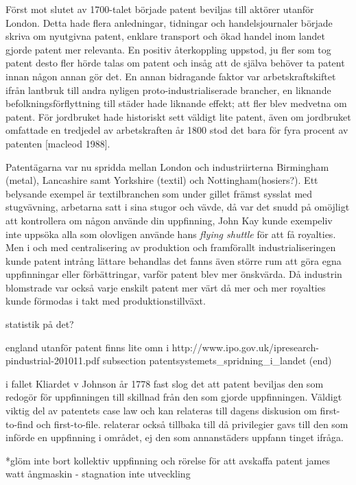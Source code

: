 Först mot slutet av 1700-talet började patent beviljas till aktörer utanför London. Detta hade flera
anledningar, tidningar och handelsjournaler började skriva om nyutgivna patent, enklare transport och
ökad handel inom landet gjorde patent mer relevanta. En positiv återkoppling uppstod, ju fler som tog
patent desto fler hörde talas om patent och insåg att de själva behöver ta patent innan någon annan gör
det. En annan bidragande faktor var arbetskraftskiftet ifrån lantbruk till andra nyligen
proto-industrialiserade brancher, en liknande befolkningsförflyttning till städer hade liknande effekt;
att fler blev medvetna om patent. För jordbruket hade historiskt sett väldigt lite patent, även om
jordbruket omfattade en tredjedel av arbetskraften år 1800 stod det bara för fyra procent av patenten
[macleod 1988].

Patentägarna var nu spridda mellan London och industriirterna Birmingham (metal), Lancashire samt
Yorkshire (textil) och Nottingham(hosiers?). Ett belysande exempel är textilbranchen som under gillet
främst sysslat med stugvävning, arbetarna satt i sina stugor och vävde, då var det snudd på omöjligt att
kontrollera om någon använde din uppfinning, John Kay kunde exempeliv inte uppsöka alla som olovligen
använde hans \emph{flying shuttle} för att få royalties. Men i och med centralisering av produktion och
framförallt industrialiseringen kunde patent intrång lättare behandlas det fanns även större rum att göra
egna uppfinningar eller förbättringar, varför patent blev mer önskvärda. Då industrin blomstrade var
också varje enskilt patent mer värt då mer och mer royalties kunde förmodas i takt med
produktionstillväxt.

statistik på det?

england utanför patent finns lite omn i http://www.ipo.gov.uk/ipresearch-pindustrial-201011.pdf %
subsection patentsystemets_spridning_i_landet (end)

i fallet Kliardet v Johnson år 1778 fast slog det att patent beviljas den som redogör för uppfinningen
till skillnad från den som gjorde uppfinningen. Väldigt viktig del av patentets case law och kan
relateras till dagens diskusion om first-to-find och first-to-file. relaterar också tillbaka till då
privilegier gavs till den som införde en uppfinning i området, ej den som annanstäders uppfann tinget
ifråga.

*glöm inte bort kollektiv uppfinning och rörelse för att avskaffa patent james watt ångmaskin -
stagnation inte utveckling


